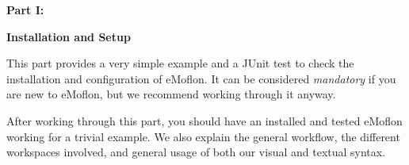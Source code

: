 {\bf \huge Part I:}
\vspace{0.7cm}
 
{\bf \Huge Installation and Setup }

\vspace{0.5cm}

This part provides a very simple example and a JUnit test to check the installation and configuration of eMoflon. It can be considered \emph{mandatory} if you
are new to eMoflon, but we recommend working through it anyway.

After working through this part, you should have an installed and tested eMoflon working for a trivial example. We also explain the general workflow, the
different workspaces involved, and general usage of both our visual and textual syntax.






